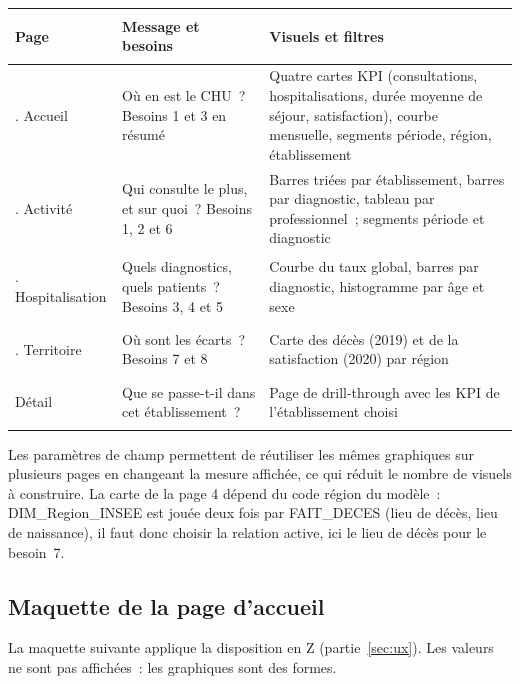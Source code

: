 \begin{center}
\small
\begin{tabularx}{\textwidth}{>{\bfseries\raggedright\arraybackslash}p{2.9cm} >{\raggedright\arraybackslash}p{4cm} >{\raggedright\arraybackslash}X}
\toprule
Page & Message et besoins & Visuels et filtres \\
\midrule
1. Accueil & Où en est le CHU~? Besoins 1 et 3 en résumé & Quatre cartes KPI (consultations, hospitalisations, durée moyenne de séjour, satisfaction), courbe mensuelle, segments période, région, établissement \\
2. Activité & Qui consulte le plus, et sur quoi~? Besoins 1, 2 et 6 & Barres triées par établissement, barres par diagnostic, tableau par professionnel~; segments période et diagnostic \\
3. Hospitalisation & Quels diagnostics, quels patients~? Besoins 3, 4 et 5 & Courbe du taux global, barres par diagnostic, histogramme par âge et sexe \\
4. Territoire & Où sont les écarts~? Besoins 7 et 8 & Carte des décès (2019) et de la satisfaction (2020) par région \\
Détail & Que se passe-t-il dans cet établissement~? & Page de drill-through avec les KPI de l'établissement choisi \\
\bottomrule
\end{tabularx}
\end{center}

\noindent Les paramètres de champ permettent de réutiliser les mêmes graphiques sur plusieurs pages en changeant la mesure affichée, ce qui réduit le nombre de visuels à construire. La carte de la page 4 dépend du code région du modèle~: DIM\_Region\_INSEE est jouée deux fois par FAIT\_DECES (lieu de décès, lieu de naissance), il faut donc choisir la relation active, ici le lieu de décès pour le besoin~7.

\subsection{Maquette de la page d'accueil}

\noindent La maquette suivante applique la disposition en Z (partie~\ref{sec:ux}). Les valeurs ne sont pas affichées~: les graphiques sont des formes.

